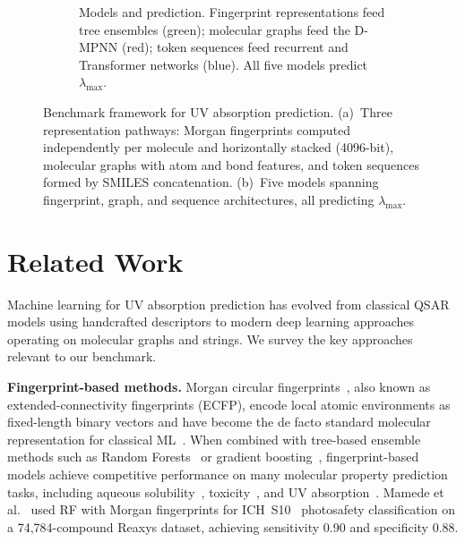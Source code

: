 \documentclass[journal=jcisd8,manuscript=article]{achemso}
\begin{document}
\begin{figure}[!ht]
\begin{subfigure}[b]{\textwidth}
 \caption{Models and prediction. Fingerprint representations feed tree ensembles (green); molecular graphs feed the D-MPNN (red); token sequences feed recurrent and Transformer networks (blue). All five models predict $\lambda_{\max}$.}
 \label{fig:framework_models}
 \end{subfigure}

 \caption{Benchmark framework for UV absorption prediction. (a)~Three representation pathways: Morgan fingerprints computed independently per molecule and horizontally stacked (4096-bit), molecular graphs with atom and bond features, and token sequences formed by SMILES concatenation. (b)~Five models spanning fingerprint, graph, and sequence architectures, all predicting $\lambda_{\max}$.}
 \label{fig:benchmark_framework}
\end{figure}

\FloatBarrier
\section{Related Work}
\label{sec:related_work}

Machine learning for UV absorption prediction has evolved from classical QSAR models using handcrafted descriptors to modern deep learning approaches operating on molecular graphs and strings.
We survey the key approaches relevant to our benchmark.

\textbf{Fingerprint-based methods.}
Morgan circular fingerprints~\cite{rogers2010extended}, also known as extended-connectivity fingerprints (ECFP), encode local atomic environments as fixed-length binary vectors and have become the de facto standard molecular representation for classical ML~\cite{wuMoleculeNet2018}.
When combined with tree-based ensemble methods such as Random Forests~\cite{breiman2001random} or gradient boosting~\cite{chen2016xgboost}, fingerprint-based models achieve competitive performance on many molecular property prediction tasks, including aqueous solubility~\cite{delaney2004esol, panapitiya2022evaluation}, toxicity~\cite{mayr2016deeptox}, and UV absorption~\cite{mamede2021machine}.
Mamede et al.~\cite{mamede2021machine} used RF with Morgan fingerprints for ICH~S10~\cite{ICH2013S10} photosafety classification on a 74,784-compound Reaxys dataset, achieving sensitivity 0.90 and specificity 0.88.
\end{document}
